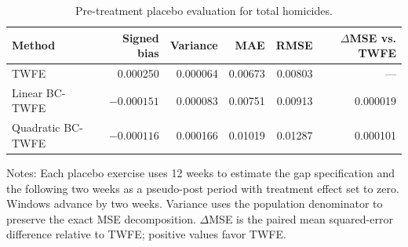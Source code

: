 \begin{table}[htbp]
\centering\small
\caption{Pre-treatment placebo evaluation for total homicides.}\label{tab:empiricalplacebo}
\begin{tabular}{lrrrrr}
\toprule
Method & Signed bias & Variance & MAE & RMSE & $\Delta$MSE vs. TWFE \\
\midrule
TWFE & 0.000250 & 0.000064 & 0.00673 & 0.00803 & --- \\
Linear BC-TWFE & $-0.000151$ & 0.000083 & 0.00751 & 0.00913 & 0.000019 \\
Quadratic BC-TWFE & $-0.000116$ & 0.000166 & 0.01019 & 0.01287 & 0.000101 \\
\bottomrule
\end{tabular}
\par\smallskip\begin{minipage}{0.94\linewidth}\footnotesize Notes: Each placebo exercise uses 12 weeks to estimate the gap specification and the following two weeks as a pseudo-post period with treatment effect set to zero. Windows advance by two weeks. Variance uses the population denominator to preserve the exact MSE decomposition. $\Delta$MSE is the paired mean squared-error difference relative to TWFE; positive values favor TWFE.\end{minipage}
\end{table}
